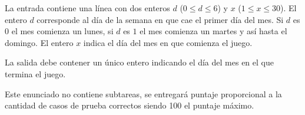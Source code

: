 \documentclass{oci}
\begin{document}
\begin{inputDescription}
  La entrada contiene una línea con dos enteros $d$ ($0 \leq d \leq 6$) y $x$ ($1 \leq x \leq 30$).
  El entero $d$ corresponde al día de la semana en que cae el primer día del mes.
  Si $d$ es $0$ el mes comienza un lunes, si $d$ es $1$ el mes comienza un martes y así hasta el domingo.
  El entero $x$ indica el día del mes en que comienza el juego.
\end{inputDescription}

\begin{outputDescription}
  La salida debe contener un único entero indicando el día del mes en el que termina el juego.
\end{outputDescription}

\begin{scoreDescription}
  Este enunciado no contiene subtareas, se entregará puntaje proporcional a la cantidad de casos
  de prueba correctos siendo 100 el puntaje máximo.
\end{scoreDescription}

\begin{sampleDescription}
\end{sampleDescription}
\end{document}
